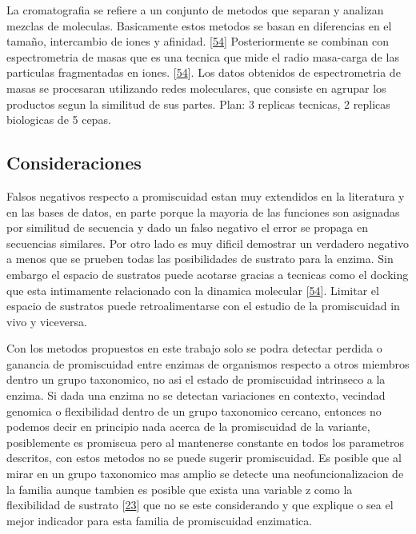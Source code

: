 \documentclass[12pt,twoside]{reedthesis}
\begin{document}
  La cromatografia se refiere a un conjunto de metodos que separan y
  analizan mezclas de moleculas. Basicamente estos metodos se basan en
  diferencias en el tamaño, intercambio de iones y afinidad.
  {[}\protect\hyperlink{ref-campbell_biophysical_2012}{54}{]}
  Posteriormente se combinan con espectrometria de masas que es una
  tecnica que mide el radio masa-carga de las particulas fragmentadas en
  iones. {[}\protect\hyperlink{ref-campbell_biophysical_2012}{54}{]}. Los
  datos obtenidos de espectrometria de masas se procesaran utilizando
  redes moleculares, que consiste en agrupar los productos segun la
  similitud de sus partes. Plan: 3 replicas tecnicas, 2 replicas
  biologicas de 5 cepas.
  
  \subsection{Consideraciones}\label{consideraciones}
  
  Falsos negativos respecto a promiscuidad estan muy extendidos en la
  literatura y en las bases de datos, en parte porque la mayoria de las
  funciones son asignadas por similitud de secuencia y dado un falso
  negativo el error se propaga en secuencias similares. Por otro lado es
  muy dificil demostrar un verdadero negativo a menos que se prueben todas
  las posibilidades de sustrato para la enzima. Sin embargo el espacio de
  sustratos puede acotarse gracias a tecnicas como el docking que esta
  intimamente relacionado con la dinamica molecular
  {[}\protect\hyperlink{ref-campbell_biophysical_2012}{54}{]}. Limitar el
  espacio de sustratos puede retroalimentarse con el estudio de la
  promiscuidad in vivo y viceversa.
  
  Con los metodos propuestos en este trabajo solo se podra detectar
  perdida o ganancia de promiscuidad entre enzimas de organismos respecto
  a otros miembros dentro un grupo taxonomico, no asi el estado de
  promiscuidad intrinseco a la enzima. Si dada una enzima no se detectan
  variaciones en contexto, vecindad genomica o flexibilidad dentro de un
  grupo taxonomico cercano, entonces no podemos decir en principio nada
  acerca de la promiscuidad de la variante, posiblemente es promiscua pero
  al mantenerse constante en todos los parametros descritos, con estos
  metodos no se puede sugerir promiscuidad. Es posible que al mirar en un
  grupo taxonomico mas amplio se detecte una neofuncionalizacion de la
  familia aunque tambien es posible que exista una variable z como la
  flexibilidad de sustrato
  {[}\protect\hyperlink{ref-nobeli_protein_2009}{23}{]} que no se este
  considerando y que explique o sea el mejor indicador para esta familia
  de promiscuidad enzimatica.
  
\end{document}
